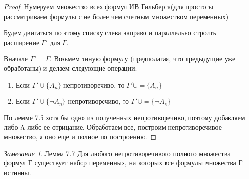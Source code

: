 \documentclass[a4paper]{article}
\theoremstyle{definition}
\theoremstyle{remark}
\newtheorem*{remark}{Замечание}
\begin{document}
    \begin{proof}
        Нумеруем множество всех формул ИВ Гильберта(для простоты рассматриваем формулы с не более чем счетным множеством переменных)

        Будем двигаться по этому списку слева направо и параллельно строить расширение $\Gamma'$ для $\Gamma$.

        Вначале $\Gamma' = \Gamma.$ Возьмем энную формулу (предполагая, что предыдущие уже обработаны)
        и делаем следующие операции:
        \begin{enumerate}
            \item Если $\Gamma' \cup \{A_n\}$ непротиворечиво, то $\Gamma' \cup= \{A_n\}$
            \item Если $\Gamma' \cup \{\neg A_n\}$ непротиворечиво, то $\Gamma' \cup= \{\neg A_n\}$
        \end{enumerate}
        По лемме 7.5 хотя бы одно из полученных непротиворечиво, поэтому добавляем либо A либо ее отрицание.
        Обработаем все, построим непротиворечивое множество, а оно еще и полное по построению.
    \end{proof}
	\begin{remark}
		Лемма 7.7 Для любого непротиворечивого полного множества формул Г существует набор переменных,
        на которых все формулы множества Г истинны.
	\end{remark}
\end{document}
